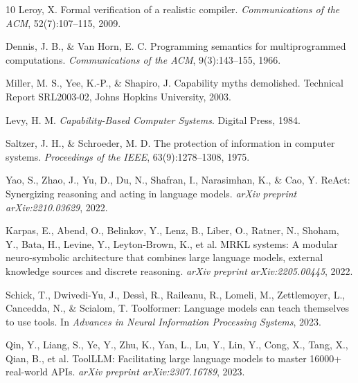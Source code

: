 \documentclass[11pt,a4paper]{article}
\begin{document}
\begin{thebibliography}{10}
Leroy, X.
\newblock Formal verification of a realistic compiler.
\newblock \textit{Communications of the ACM}, 52(7):107--115, 2009.


Dennis, J. B., \& Van Horn, E. C.
\newblock Programming semantics for multiprogrammed computations.
\newblock \textit{Communications of the ACM}, 9(3):143--155, 1966.

Miller, M. S., Yee, K.-P., \& Shapiro, J.
\newblock Capability myths demolished.
\newblock Technical Report SRL2003-02, Johns Hopkins University, 2003.

Levy, H. M.
\newblock \textit{Capability-Based Computer Systems}.
\newblock Digital Press, 1984.

Saltzer, J. H., \& Schroeder, M. D.
\newblock The protection of information in computer systems.
\newblock \textit{Proceedings of the IEEE}, 63(9):1278--1308, 1975.


Yao, S., Zhao, J., Yu, D., Du, N., Shafran, I., Narasimhan, K., \& Cao, Y.
\newblock ReAct: Synergizing reasoning and acting in language models.
\newblock \textit{arXiv preprint arXiv:2210.03629}, 2022.

Karpas, E., Abend, O., Belinkov, Y., Lenz, B., Liber, O., Ratner, N., Shoham, Y., Bata, H., Levine, Y., Leyton-Brown, K., et al.
\newblock MRKL systems: A modular neuro-symbolic architecture that combines large language models, external knowledge sources and discrete reasoning.
\newblock \textit{arXiv preprint arXiv:2205.00445}, 2022.


Schick, T., Dwivedi-Yu, J., Dess\`{i}, R., Raileanu, R., Lomeli, M., Zettlemoyer, L., Cancedda, N., \& Scialom, T.
\newblock Toolformer: Language models can teach themselves to use tools.
\newblock In \textit{Advances in Neural Information Processing Systems}, 2023.

Qin, Y., Liang, S., Ye, Y., Zhu, K., Yan, L., Lu, Y., Lin, Y., Cong, X., Tang, X., Qian, B., et al.
\newblock ToolLLM: Facilitating large language models to master 16000+ real-world APIs.
\newblock \textit{arXiv preprint arXiv:2307.16789}, 2023.


\end{thebibliography}
\end{document}
